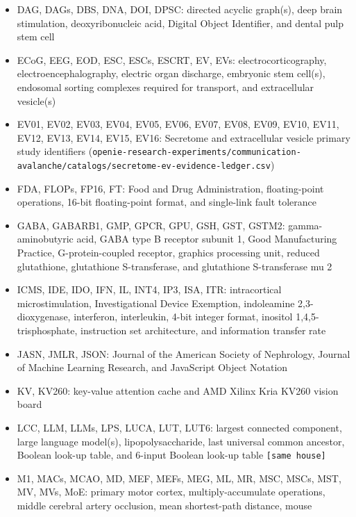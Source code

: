 \documentclass[10pt,letterpaper]{article}
\begin{document}
\begin{itemize}
\item
  DAG, DAGs, DBS, DNA, DOI, DPSC: directed acyclic graph(s), deep brain
  stimulation, deoxyribonucleic acid, Digital Object Identifier, and
  dental pulp stem cell
\item
  ECoG, EEG, EOD, ESC, ESCs, ESCRT, EV, EVs: electrocorticography,
  electroencephalography, electric organ discharge, embryonic stem
  cell(s), endosomal sorting complexes required for transport, and
  extracellular vesicle(s)
\item
  EV01, EV02, EV03, EV04, EV05, EV06, EV07, EV08, EV09, EV10, EV11,
  EV12, EV13, EV14, EV15, EV16: Secretome and extracellular vesicle
  primary study identifiers
  (\texttt{openie-\allowbreak{}research-\allowbreak{}experiments/\allowbreak{}communication-\allowbreak{}avalanche/\allowbreak{}catalogs/\allowbreak{}secretome-\allowbreak{}ev-\allowbreak{}evidence-\allowbreak{}ledger.\allowbreak{}csv})
\item
  FDA, FLOPs, FP16, FT: Food and Drug Administration, floating-point
  operations, 16-bit floating-point format, and single-link fault
  tolerance
\item
  GABA, GABARB1, GMP, GPCR, GPU, GSH, GST, GSTM2: gamma-aminobutyric
  acid, GABA type B receptor subunit 1, Good Manufacturing Practice,
  G-protein-coupled receptor, graphics processing unit, reduced
  glutathione, glutathione S-transferase, and glutathione S-transferase
  mu 2
\item
  ICMS, IDE, IDO, IFN, IL, INT4, IP3, ISA, ITR: intracortical
  microstimulation, Investigational Device Exemption, indoleamine
  2,3-dioxygenase, interferon, interleukin, 4-bit integer format,
  inositol 1,4,5-trisphosphate, instruction set architecture, and
  information transfer rate
\item
  JASN, JMLR, JSON: Journal of the American Society of Nephrology,
  Journal of Machine Learning Research, and JavaScript Object Notation
\item
  KV, KV260: key-value attention cache and AMD Xilinx Kria KV260 vision
  board
\item
  LCC, LLM, LLMs, LPS, LUCA, LUT, LUT6: largest connected component,
  large language model(s), lipopolysaccharide, last universal common
  ancestor, Boolean look-up table, and 6-input Boolean look-up table
  \texttt{{[}same\ house{]}}
\item
  M1, MACs, MCAO, MD, MEF, MEFs, MEG, ML, MR, MSC, MSCs, MST, MV, MVs,
  MoE: primary motor cortex, multiply-accumulate operations, middle
  cerebral artery occlusion, mean shortest-path distance, mouse

\end{itemize}
\end{document}
